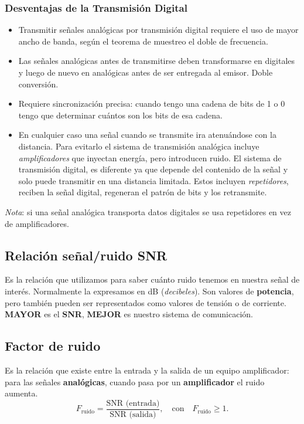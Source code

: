 \documentclass[10pt,a4paper]{article}
\begin{document}
\subsubsection{Desventajas de la Transmisión Digital}
\begin{itemize}
\item Transmitir señales analógicas por transmisión digital requiere el uso de mayor ancho de banda, según el teorema de muestreo el doble de frecuencia.
\item Las señales analógicas antes de transmitirse deben transformarse en digitales y luego de nuevo en analógicas antes de ser entregada al emisor. Doble conversión.
\item Requiere sincronización precisa: cuando tengo una cadena de bits de 1 o 0 tengo que determinar cuántos son los bits de esa cadena.
\item En cualquier caso una señal cuando se transmite ira atenuándose con la distancia. Para evitarlo el sistema de transmisión analógica incluye \textit{amplificadores} que inyectan energía, pero introducen ruido. El sistema de transmisión digital, es diferente ya que depende del contenido de la señal y solo puede transmitir en una distancia limitada. Estos incluyen \textit{repetidores}, reciben la señal digital, regeneran el patrón de bits y los retransmite. 
\end{itemize}
\textit{Nota}: si una señal analógica transporta datos digitales se usa repetidores en vez de amplificadores.

\subsection{Relación señal/ruido SNR}
Es la relación que utilizamos para saber cuánto ruido tenemos en nuestra señal de interés. Normalmente la expresamos en dB (\textit{decibeles}). Son valores de \textbf{potencia}, pero también pueden ser representados como valores de tensión o de corriente. \textbf{MAYOR} es el \textbf{SNR}, \textbf{MEJOR} es nuestro sistema de comunicación.

\subsection{Factor de ruido}
Es la relación que existe entre la entrada y la salida de un equipo amplificador: para las señales \textbf{analógicas}, cuando pasa por un \textbf{amplificador} el ruido aumenta.
\[F_\text{ruido} = \frac{\text{SNR (entrada)}}{\text{SNR (salida)}}, \quad \text{con} \quad   F_\text{ruido} \geq 1.\]
\end{document}
